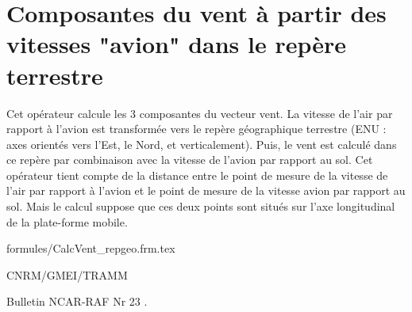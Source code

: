 %
\section{Composantes du vent \`a partir des vitesses "avion" dans le rep\`ere terrestre}

 

Cet op\'erateur calcule les 3 composantes du vecteur vent. La vitesse
de l'air par rapport \`a l'avion est transform\'ee vers le
rep\`ere g\'eographique terrestre 
(ENU : axes orient\'es vers l'Est, le Nord, et verticalement).
Puis, le vent est calcul\'e dans ce rep\`ere par combinaison avec la
vitesse de l'avion par rapport au sol.
Cet op\'erateur tient compte de la distance entre le point
de mesure de la vitesse de l'air par rapport \`a l'avion
et le point de mesure de la vitesse avion par rapport au sol.
Mais le calcul suppose que ces deux points sont situ\'es
sur l'axe longitudinal de la plate-forme mobile.

\bigskip



 {formules/CalcVent_repgeo.frm.tex}

CNRM/GMEI/TRAMM

Bulletin NCAR-RAF Nr 23 \cite{RAF-23}.
